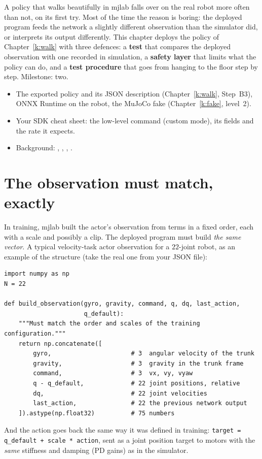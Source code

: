 \label{k:deploy}

A policy that walks beautifully in mjlab falls over on the real robot more often than not, on its first try. Most of the time the reason is boring: the deployed program feeds the network a slightly different observation than the simulator did, or interprets its output differently. This chapter deploys the policy of Chapter~\ref{k:walk} with three defences: a \textbf{test} that compares the deployed observation with one recorded in simulation, a \textbf{safety layer} that limits what the policy can do, and a \textbf{test procedure} that goes from hanging to the floor step by step. Milestone: two.

\begin{needbox}
\begin{itemize}[nosep]
  \item The exported policy and its JSON description (Chapter~\ref{k:walk}, Step~B3), ONNX Runtime on the robot, the MuJoCo fake (Chapter~\ref{k:fake}, level~2).
  \item Your SDK cheat sheet: the low-level command (custom mode), its fields and the rate it expects\guess.
  \item Background: , , , .
\end{itemize}
\end{needbox}

\section*{The observation must match, exactly}
In training, mjlab built the actor's observation from terms in a fixed order, each with a scale and possibly a clip. The deployed program must build \emph{the same vector}. A typical velocity-task actor observation for a $22$-joint robot, as an example of the structure (take the real one from your JSON file):
\begin{verbatim}
import numpy as np
N = 22

def build_observation(gyro, gravity, command, q, dq, last_action,
                      q_default):
    """Must match the order and scales of the training configuration."""
    return np.concatenate([
        gyro,                      # 3  angular velocity of the trunk
        gravity,                   # 3  gravity in the trunk frame
        command,                   # 3  vx, vy, vyaw
        q - q_default,             # 22 joint positions, relative
        dq,                        # 22 joint velocities
        last_action,               # 22 the previous network output
    ]).astype(np.float32)          # 75 numbers
\end{verbatim}
And the action goes back the same way it was defined in training: \texttt{target = q\_default + scale * action}, sent as a joint position target to motors with the \emph{same} stiffness and damping (PD gains) as in the simulator.

